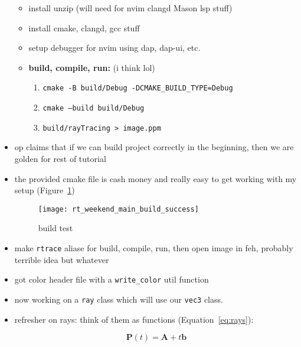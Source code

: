 \begin{itemize}
        \begin{itemize}
            \item install unzip (will need for nvim clangd Mason lsp stuff)
            \item install cmake, clangd, gcc stuff
            \item setup debugger for nvim using dap, dap-ui, etc. 
            \item \textbf{build, compile, run:} (i think lol)
                \begin{enumerate}
                    \item \texttt{cmake -B build/Debug -DCMAKE_BUILD_TYPE=Debug} 
                    \item \texttt{cmake --build build/Debug} 
                    \item \texttt{build/rayTracing > image.ppm} 
                \end{enumerate}
        \end{itemize}
    \item op claims that if we can build project correctly in the beginning,
        then we are golden for rest of tutorial
    \item the provided cmake file is cash money and really easy to get working 
        with my setup
        (Figure~\ref{fig:rt_weekend_main_build_success})
        \begin{figure}[ht]
            \centering
            \texttt{[image: rt\_weekend\_main\_build\_success]}
            \captionsetup{labelfont=bf, textfont=it}
            \caption{build test}
            \label{fig:rt_weekend_main_build_success}
        \end{figure}
    \item make \texttt{rtrace} aliase for build, compile, run, then open image
        in feh, probably terrible idea but whatever 
    \item got color header file with a \texttt{write_color} util function
    \item now working on a \texttt{ray} class which will use our \texttt{vec3} 
        class.
    \item refresher on rays: think of them as functions 
        (Equation~\ref{eq:rays}):

        \begin{equation}
            \mathbf{P}(t) = \mathbf{A} + t\mathbf{b}
            \label{eq:rays}
        \end{equation}


\end{itemize}
